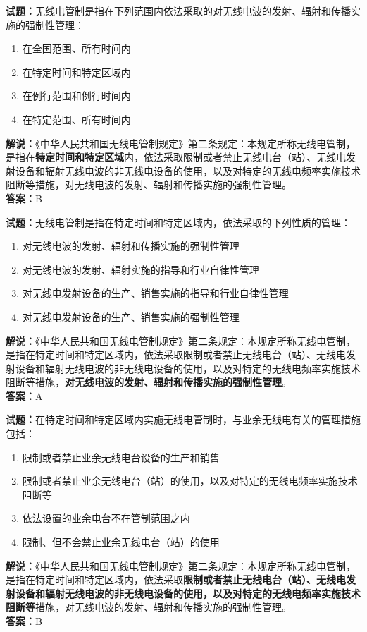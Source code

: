 \documentclass{ctexbook}
\begin{document}
\vspace{1em}

\textbf{试题：}无线电管制是指在下列范围内依法采取的对无线电波的发射、辐射和传播实施的强制性管理：
\begin{enumerate}[leftmargin=3em]
  \item 在全国范围、所有时间内
  \item 在特定时间和特定区域内
  \item 在例行范围和例行时间内
  \item 在特定范围、所有时间内
\end{enumerate}
\noindent\textbf{解说：}《中华人民共和国无线电管制规定》第二条规定：本规定所称无线电管制，是指在\textbf{特定时间和特定区域}内，依法采取限制或者禁止无线电台（站）、无线电发射设备和辐射无线电波的非无线电设备的使用，以及对特定的无线电频率实施技术阻断等措施，对无线电波的发射、辐射和传播实施的强制性管理。\\\noindent\textbf{答案：}B

\vspace{1em}

\textbf{试题：}无线电管制是指在特定时间和特定区域内，依法采取的下列性质的管理：
\begin{enumerate}[leftmargin=3em]
  \item 对无线电波的发射、辐射和传播实施的强制性管理
  \item 对无线电波的发射、辐射实施的指导和行业自律性管理
  \item 对无线电发射设备的生产、销售实施的指导和行业自律性管理
  \item 对无线电发射设备的生产、销售实施的强制性管理
\end{enumerate}
\noindent\textbf{解说：}《中华人民共和国无线电管制规定》第二条规定：本规定所称无线电管制，是指在特定时间和特定区域内，依法采取限制或者禁止无线电台（站）、无线电发射设备和辐射无线电波的非无线电设备的使用，以及对特定的无线电频率实施技术阻断等措施，\textbf{对无线电波的发射、辐射和传播实施的强制性管理}。\\\noindent\textbf{答案：}A

\vspace{1em}

\textbf{试题：}在特定时间和特定区域内实施无线电管制时，与业余无线电有关的管理措施包括：
\begin{enumerate}[leftmargin=3em]
  \item 限制或者禁止业余无线电台设备的生产和销售
  \item 限制或者禁止业余无线电台（站）的使用，以及对特定的无线电频率实施技术阻断等
  \item 依法设置的业余电台不在管制范围之内
  \item 限制、但不会禁止业余无线电台（站）的使用
\end{enumerate}
\noindent\textbf{解说：}《中华人民共和国无线电管制规定》第二条规定：本规定所称无线电管制，是指在特定时间和特定区域内，依法采取\textbf{限制或者禁止无线电台（站）、无线电发射设备和辐射无线电波的非无线电设备的使用，以及对特定的无线电频率实施技术阻断等}措施，对无线电波的发射、辐射和传播实施的强制性管理。\\\noindent\textbf{答案：}B
\end{document}
